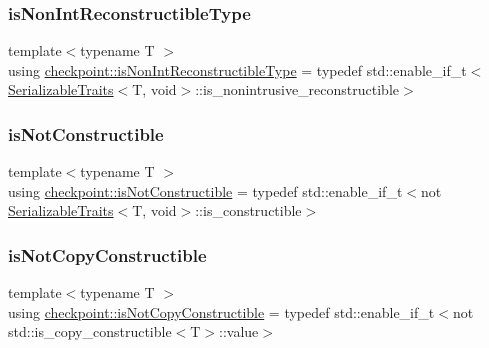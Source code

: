 \mbox{\label{namespacecheckpoint_a46b7909fb0fef92b4787567fde7c760b}} 
\subsubsection{\texorpdfstring{is\+Non\+Int\+Reconstructible\+Type}{isNonIntReconstructibleType}}
{\footnotesize\ttfamily template$<$typename T $>$ \\
using \hyperlink{namespacecheckpoint_a46b7909fb0fef92b4787567fde7c760b}{checkpoint\+::is\+Non\+Int\+Reconstructible\+Type} = typedef std\+::enable\+\_\+if\+\_\+t$<$ \hyperlink{structcheckpoint_1_1_serializable_traits}{Serializable\+Traits}$<$T, void$>$\+::is\+\_\+nonintrusive\+\_\+reconstructible$>$}

\mbox{\label{namespacecheckpoint_a14b3c81988a2c2d3c935edcc653b6322}} 
\subsubsection{\texorpdfstring{is\+Not\+Constructible}{isNotConstructible}}
{\footnotesize\ttfamily template$<$typename T $>$ \\
using \hyperlink{namespacecheckpoint_a14b3c81988a2c2d3c935edcc653b6322}{checkpoint\+::is\+Not\+Constructible} = typedef std\+::enable\+\_\+if\+\_\+t$<$not \hyperlink{structcheckpoint_1_1_serializable_traits}{Serializable\+Traits}$<$T, void$>$\+::is\+\_\+constructible$>$}

\mbox{\label{namespacecheckpoint_a141a100f9dcca06fb0b6dbf44a5d6756}} 
\subsubsection{\texorpdfstring{is\+Not\+Copy\+Constructible}{isNotCopyConstructible}}
{\footnotesize\ttfamily template$<$typename T $>$ \\
using \hyperlink{namespacecheckpoint_a141a100f9dcca06fb0b6dbf44a5d6756}{checkpoint\+::is\+Not\+Copy\+Constructible} = typedef std\+::enable\+\_\+if\+\_\+t$<$not std\+::is\+\_\+copy\+\_\+constructible$<$T$>$\+::value$>$}

